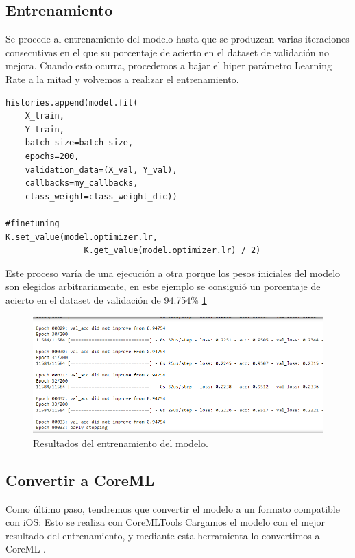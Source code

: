 \documentclass[../main.tex]{subfiles}
\begin{document}
\subsection{Entrenamiento}

Se procede al entrenamiento del modelo hasta que se produzcan varias iteraciones consecutivas en el que su porcentaje de acierto en el dataset de validación no mejora. Cuando esto ocurra, procedemos a bajar el hiper parámetro Learning Rate a la mitad y volvemos a realizar el entrenamiento.

\begin{lstlisting}[style=stylepython]
histories.append(model.fit(
    X_train, 
    Y_train, 
    batch_size=batch_size, 
    epochs=200, 
    validation_data=(X_val, Y_val),
    callbacks=my_callbacks,
    class_weight=class_weight_dic))
    
#finetuning
K.set_value(model.optimizer.lr,
                K.get_value(model.optimizer.lr) / 2)
\end{lstlisting}

Este proceso varía de una ejecución a otra porque los pesos iniciales del modelo son elegidos arbitrariamente, en este ejemplo se consiguió un porcentaje de acierto en el dataset de validación de 94.754\% \ref{figure17}

\begin{figure}[h]
\centering 
\includegraphics[width=1\textwidth]{images/modelo/validation.PNG}
\caption{Resultados del entrenamiento del modelo.}
\label{figure17}
\end{figure}

\newpage

\subsection{Convertir a CoreML}

Como último paso, tendremos que convertir el modelo a un formato compatible con iOS: Esto se realiza con CoreMLTools \cite{COREMLTOOLS}
Cargamos el modelo con el mejor resultado del entrenamiento, y mediante esta herramienta lo convertimos a CoreML \cite{COREML}.
\end{document}
